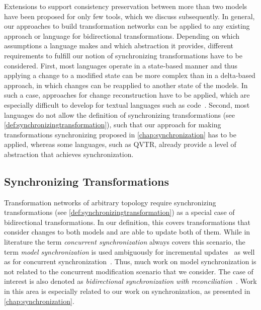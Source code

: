 Extensions to support consistency preservation between more than two models have been proposed for only few tools, which we discuss subsequently.
In general, our approaches to build transformation networks can be applied to any existing approach or language for bidirectional transformations.
Depending on which assumptions a language makes and which abstraction it provides, different requirements to fulfill our notion of synchronizing transformations have to be considered.
First, most languages operate in a state-based manner and thus applying a change to a modified state can be more complex than in a delta-based approach, in which changes can be reapplied to another state of the models. 
In such a case, approaches for change reconstruction have to be applied, which are especially difficult to develop for textual languages such as code~\cite{falleri2014codeDifferencing-ASE}.
Second, most languages do not allow the definition of synchronizing transformations (see \autoref{def:synchronizingtransformation}), such that our approach for making transformations synchronizing proposed in \autoref{chap:synchronization} has to be applied, whereas some languages, such as \gls{QVTR}, already provide a level of abstraction that achieves synchronization.


\subsection{Synchronizing Transformations}

Transformation networks of arbitrary topology require synchronizing transformations (see \autoref{def:synchronizingtransformation}) as a special case of bidirectional transformations.
In our definition, this covers transformations that consider changes to both models and are able to update both of them.
While in literature the term \emph{concurrent synchronization} always covers this scenario, the term \emph{model synchronization} is used ambiguously for incremental updates~\cite{giese2009incrementalModelSynchronization-SoSym} as well as for concurrent synchronization~\cite{samimi-dehkordi2015bidirectionalSynchronization-ICCKE}.
Thus, much work on model synchronization is not related to the concurrent modification scenario that we consider.
The case of interest is also denoted as \emph{bidirectional synchronization with reconciliation}~\cite{antkiewicz2008synchronizationDesignSpace-GTTSE}.
Work in this area is especially related to our work on synchronization, as presented in \autoref{chap:synchronization}.

